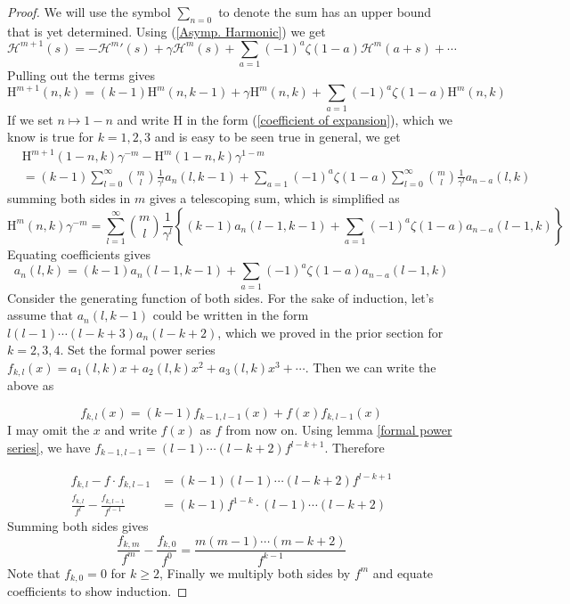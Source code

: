 \documentclass[10pt,a4paper]{amsart}
\begin{document}
\begin{proof}
    We will use the symbol $\sum_{n=0}$ to denote the sum has an upper bound that is yet determined. Using (\ref{Asymp. Harmonic}) we get\begin{equation}\label{relating m+1 to m}
        \mathcal{H}^{m+1}(s)=-{\mathcal{H}^m}'(s)+\gamma \mathcal{H}^m (s)+\sum_{a=1}(-1)^a \zeta(1-a)\mathcal{H}^m(a+s)+\cdots
    \end{equation} Pulling out the terms gives
    \[\mathrm{H}^{m+1}(n,k)=(k-1)\mathrm{H}^m(n,k-1)+\gamma\mathrm{H}^m(n,k)+\sum_{a=1}(-1)^a \zeta(1-a)\mathrm{H}^m(n,k)\]
If we set $n\mapsto 1-n$ and write H in the form (\ref{coefficient of expansion}), which we know is true for $k=1,2,3$ and is easy to be seen true in general, we get
\[\begin{split}
   & \mathrm{H}^{m+1}(1-n,k)\gamma^{-m}- \mathrm{H}^m(1-n,k)\gamma^{1-m} \\ & =(k-1)\sum_{l=0}^{\infty}\binom{m}{l}\frac{1}{\gamma^l}a_n(l,k-1) +\sum_{a=1} (-1)^a\zeta(1-a)\sum_{l=0}^{\infty}\binom{m}{l}\frac{1}{\gamma^l}a_{n-a}(l,k)
\end{split}\]
summing both sides in $m$ gives a telescoping sum, which is simplified as
\[\mathrm{H}^m(n,k)\gamma^{-m}=\sum_{l=1}^{\infty}\binom{m}{l}\frac{1}{\gamma^{l}}\left\{(k-1)a_n(l-1,k-1)+\sum_{a=1}(-1)^a \zeta(1-a)a_{n-a}(l-1,k)\right\}\]
Equating coefficients gives
\[a_n(l,k)=(k-1)a_n(l-1,k-1)+\sum_{a=1}(-1)^a \zeta(1-a)a_{n-a}(l-1,k)\]
Consider the generating function of both sides. For the sake of induction, let's assume that $a_n(l,k-1)$ could be written in the form $l(l-1)\cdots(l-k+3)a_n(l-k+2)$, which we proved in the prior section for $k=2,3,4$. Set the formal power series $f_{k,l}(x)=a_1(l,k)x +a_2(l,k)x^2+a_3(l,k)x^3+\cdots$. Then we can write the above as 

$$f_{k,l}(x)=(k-1)f_{k-1,l-1}(x)+f(x)f_{k,l-1}(x)$$
I may omit the $x$ and write $f(x)$ as $f$ from now on. Using lemma \ref{formal power series}, we have $f_{k-1,l-1}=(l-1)\cdots(l-k+2)f^{l-k+1}$. Therefore

\[\begin{split}
    f_{k,l}-f\cdot f_{k,l-1}&=(k-1)(l-1)\cdots(l-k+2)f^{l-k+1}\\ 
\frac{f_{k,l}}{f^l}-\frac{f_{k,l-1}}{f^{l-1}}& =(k-1)f^{1-k}\cdot (l-1)\cdots (l-k+2)
\end{split}\]
Summing both sides gives
\[\frac{f_{k,m}}{f^m}-\frac{f_{k,0}}{f^0}=\frac{m(m-1)\cdots(m-k+2)}{f^{k-1}}\]
Note that $f_{k,0}=0$ for $k\geq 2$, Finally we multiply both sides by $f^m$ and equate coefficients to show induction.\end{proof}
\end{document}
